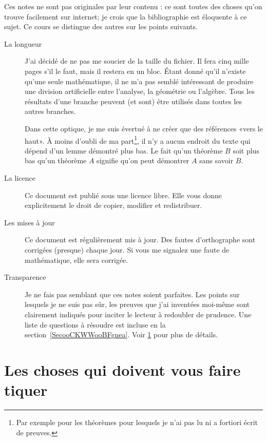 Ces notes ne sont pas originales par leur contenu : ce sont toutes des choses qu'on trouve facilement sur internet; je crois que la bibliographie est éloquente à ce sujet. Ce cours se distingue des autres sur les points suivants.
\begin{description}
	\item[La longueur] J'ai décidé de ne pas me soucier de la taille du fichier. Il fera cinq mille pages s'il le faut, mais il restera en un bloc. Étant donné qu'il n'existe qu'une seule mathématique, il ne m'a pas semblé intéressant de produire une division artificielle entre l'analyse, la géométrie ou l'algèbre. Tous les résultats d'une branche peuvent (et sont) être utilisés dans toutes les autres branches.

	      Dans cette optique, je me suis évertué à ne créer que des références «vers le haut». À moins d'oubli de ma part\footnote{Par exemple pour les théorèmes pour lesquels je n'ai pas lu ni a fortiori écrit de preuves.}, il n'y a aucun endroit du texte qui dépend d'un lemme démontré plus bas. Le fait qu'un théorème \( B\) soit plus bas qu'un théorème \( A\) signifie qu'on peut démontrer \( A\) sans savoir \( B\).

	\item[La licence] Ce document est publié sous une licence libre. Elle vous donne explicitement le droit de copier, modifier et redistribuer.

	\item[Les mises à jour] Ce document est régulièrement mis à jour. Des fautes d'orthographe sont corrigées (presque) chaque jour. Si vous me signalez une faute de mathématique, elle sera corrigée.
	\item[Transparence] Je ne fais pas semblant que ces notes soient parfaites. Les points sur lesquels je ne suis pas sûr, les preuves que j'ai inventées moi-même sont clairement indiqués pour inciter le lecteur à redoubler de prudence. Une liste de questions à résoudre est incluse en la section~\ref{SecooCKWWooBFgnea}. Voir \ref{SECooWVHBooCaYoXP} pour plus de détails.
\end{description}

\section{Les choses qui doivent vous faire tiquer}
\label{SECooWVHBooCaYoXP}

